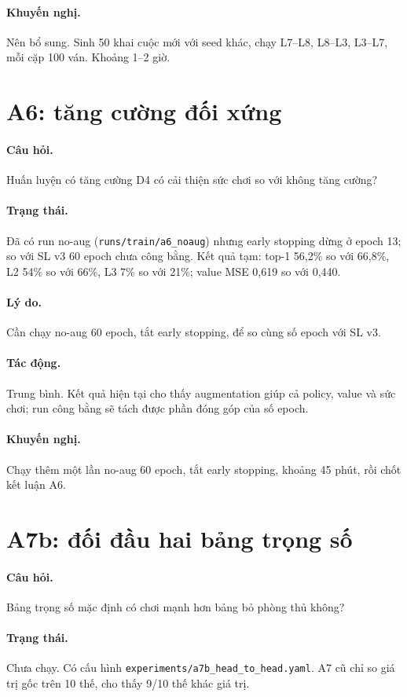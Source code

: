 \paragraph{Khuyến nghị.} Nên bổ sung. Sinh 50 khai cuộc mới với seed khác, chạy L7--L8, L8--L3,
L3--L7, mỗi cặp 100 ván. Khoảng 1--2 giờ.

\section{A6: tăng cường đối xứng}
\paragraph{Câu hỏi.} Huấn luyện có tăng cường D4 có cải thiện sức chơi so với không tăng cường?
\paragraph{Trạng thái.} Đã có run no-aug (\texttt{runs/train/a6\_noaug}) nhưng early stopping
dừng ở epoch 13; so với SL v3 60 epoch chưa công bằng. Kết quả tạm: top-1 56,2\% so với 66,8\%,
L2 54\% so với 66\%, L3 7\% so với 21\%; value MSE 0,619 so với 0,440.
\paragraph{Lý do.} Cần chạy no-aug 60 epoch, tắt early stopping, để so cùng số epoch với SL v3.
\paragraph{Tác động.} Trung bình. Kết quả hiện tại cho thấy augmentation giúp cả policy, value và sức
chơi; run công bằng sẽ tách được phần đóng góp của số epoch.
\paragraph{Khuyến nghị.} Chạy thêm một lần no-aug 60 epoch, tắt early stopping, khoảng 45 phút,
rồi chốt kết luận A6.

\section{A7b: đối đầu hai bảng trọng số}
\paragraph{Câu hỏi.} Bảng trọng số mặc định có chơi mạnh hơn bảng bỏ phòng thủ không?
\paragraph{Trạng thái.} Chưa chạy. Có cấu hình \texttt{experiments/a7b\_head\_to\_head.yaml}.
A7 cũ chỉ so giá trị gốc trên 10 thế, cho thấy 9/10 thế khác giá trị.
